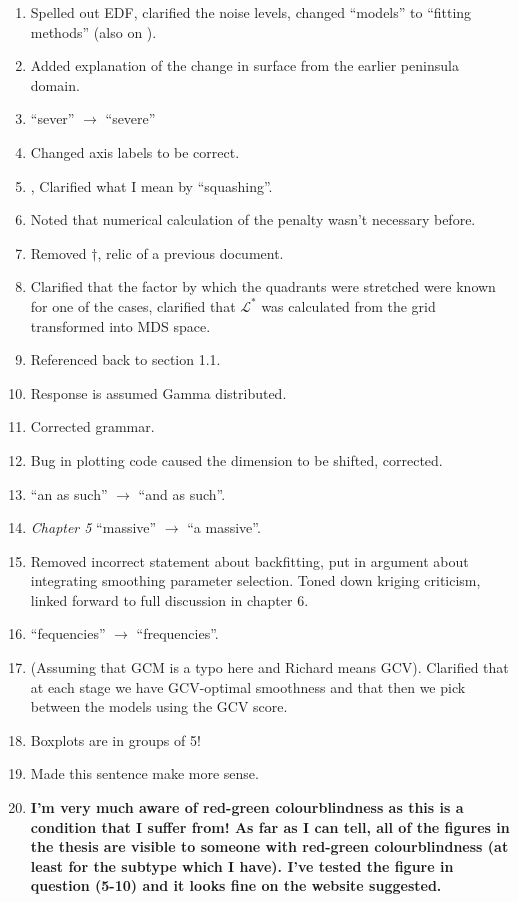 \begin{enumerate}
\item {} Spelled out EDF, clarified the noise levels, changed ``models'' to ``fitting methods'' (also on ).
\item {} Added explanation of the change in surface from the earlier peninsula domain.
\item {} ``sever'' $\rightarrow$ ``severe''
\item {} Changed axis labels to be correct.
\item {},  Clarified what I mean by ``squashing''.
\item {} Noted that numerical calculation of the penalty wasn't necessary before.
\item {} Removed $\dagger$, relic of a previous document.
\item {} Clarified that the factor by which the quadrants were stretched were known for one of the cases, clarified that $\mathcal{L}^*$ was calculated from the grid transformed into MDS space.
\item {} Referenced back to section 1.1.
\item {} Response is assumed Gamma distributed.
\item {} Corrected grammar.
\item {} Bug in plotting code caused the dimension to be shifted, corrected.
\item {} ``an as such'' $\rightarrow$ ``and as such''.
\item {} \textit{Chapter 5} ``massive'' $\rightarrow$ ``a massive''.
\item {} Removed incorrect statement about backfitting, put in argument about integrating smoothing parameter selection. Toned down kriging criticism, linked forward to full discussion in chapter 6.
\item {} ``fequencies'' $\rightarrow$ ``frequencies''.
\item {} (Assuming that GCM is a typo here and Richard means GCV). Clarified that at each stage we have GCV-optimal smoothness and that then we pick between the models using the GCV score.
\item {} Boxplots are in groups of 5!
\item {} Made this sentence make more sense.
\item \textbf{I'm very much aware of red-green colourblindness as this is a condition that I suffer from! As far as I can tell, all of the figures in the thesis are visible to someone with red-green colourblindness (at least for the subtype which I have). I've tested the figure in question (5-10) and it looks fine on the website suggested.}

\end{enumerate}
